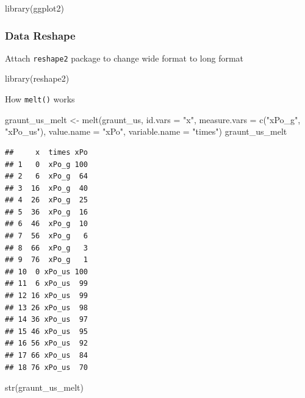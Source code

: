 \documentclass[
]{article}
\newenvironment{Shaded}{\begin{snugshade}}{\end{snugshade}}
\newcommand{\AttributeTok}[1]{\textcolor[rgb]{0.77,0.63,0.00}{#1}}
\newcommand{\FunctionTok}[1]{\textcolor[rgb]{0.00,0.00,0.00}{#1}}
\newcommand{\NormalTok}[1]{#1}
\newcommand{\OtherTok}[1]{\textcolor[rgb]{0.56,0.35,0.01}{#1}}
\newcommand{\StringTok}[1]{\textcolor[rgb]{0.31,0.60,0.02}{#1}}
\begin{document}
\begin{Shaded}
\begin{Highlighting}[]
\FunctionTok{library}\NormalTok{(ggplot2)}
\end{Highlighting}
\end{Shaded}

\hypertarget{data-reshape}{%
\subsubsection{Data Reshape}\label{data-reshape}}

Attach \texttt{reshape2} package to change wide format to long format

\begin{Shaded}
\begin{Highlighting}[]
\FunctionTok{library}\NormalTok{(reshape2)}
\end{Highlighting}
\end{Shaded}

How \texttt{melt()} works

\begin{Shaded}
\begin{Highlighting}[]
\NormalTok{graunt\_us\_melt }\OtherTok{\textless{}{-}} \FunctionTok{melt}\NormalTok{(graunt\_us, }
                       \AttributeTok{id.vars =} \StringTok{"x"}\NormalTok{, }
                       \AttributeTok{measure.vars =} \FunctionTok{c}\NormalTok{(}\StringTok{"xPo\_g"}\NormalTok{, }\StringTok{"xPo\_us"}\NormalTok{), }
                       \AttributeTok{value.name =} \StringTok{"xPo"}\NormalTok{, }
                       \AttributeTok{variable.name =} \StringTok{"times"}\NormalTok{)}
\NormalTok{graunt\_us\_melt}
\end{Highlighting}
\end{Shaded}

\begin{verbatim}
##     x  times xPo
## 1   0  xPo_g 100
## 2   6  xPo_g  64
## 3  16  xPo_g  40
## 4  26  xPo_g  25
## 5  36  xPo_g  16
## 6  46  xPo_g  10
## 7  56  xPo_g   6
## 8  66  xPo_g   3
## 9  76  xPo_g   1
## 10  0 xPo_us 100
## 11  6 xPo_us  99
## 12 16 xPo_us  99
## 13 26 xPo_us  98
## 14 36 xPo_us  97
## 15 46 xPo_us  95
## 16 56 xPo_us  92
## 17 66 xPo_us  84
## 18 76 xPo_us  70
\end{verbatim}

\begin{Shaded}
\begin{Highlighting}[]
\FunctionTok{str}\NormalTok{(graunt\_us\_melt)}
\end{Highlighting}
\end{Shaded}
\end{document}
